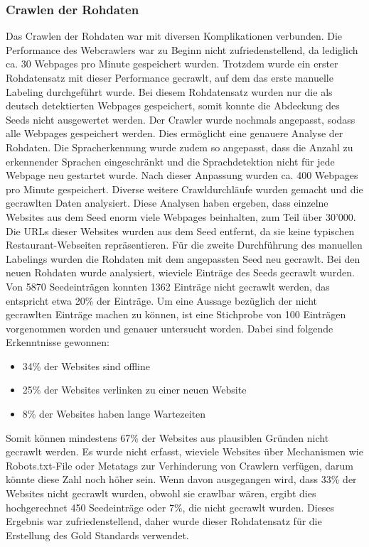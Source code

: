 \subsubsection{Crawlen der Rohdaten}
Das Crawlen der Rohdaten war mit diversen Komplikationen verbunden.
Die Performance des Webcrawlers war zu Beginn nicht zufriedenstellend, da lediglich ca. 30 Webpages pro Minute gespeichert wurden.
Trotzdem wurde ein erster Rohdatensatz mit dieser Performance gecrawlt, auf dem das erste manuelle Labeling durchgeführt wurde.
Bei diesem Rohdatensatz wurden nur die als deutsch detektierten Webpages gespeichert, somit konnte die Abdeckung des Seeds nicht ausgewertet werden.
Der Crawler wurde nochmals angepasst, sodass alle Webpages gespeichert werden.
Dies ermöglicht eine genauere Analyse der Rohdaten.
Die Spracherkennung wurde zudem so angepasst, dass die Anzahl zu erkennender Sprachen eingeschränkt und die Sprachdetektion nicht für jede Webpage neu gestartet wurde.
Nach dieser Anpassung wurden ca. 400 Webpages pro Minute gespeichert.
Diverse weitere Crawldurchläufe wurden gemacht und die gecrawlten Daten analysiert.
Diese Analysen haben ergeben, dass einzelne Websites aus dem Seed enorm viele Webpages beinhalten, zum Teil über 30'000.
Die URLs dieser Websites wurden aus dem Seed entfernt, da sie keine typischen Restaurant-Webseiten repräsentieren.
Für die zweite Durchführung des manuellen Labelings wurden die Rohdaten mit dem angepassten Seed neu gecrawlt.
Bei den neuen Rohdaten wurde analysiert, wieviele Einträge des Seeds gecrawlt wurden.
Von 5870 Seedeinträgen konnten 1362 Einträge nicht gecrawlt werden, das entspricht etwa 20\% der Einträge.
Um eine Aussage bezüglich der nicht gecrawlten Einträge machen zu können, ist eine Stichprobe von 100 Einträgen vorgenommen worden und genauer untersucht worden. Dabei sind folgende Erkenntnisse gewonnen:
\begin{itemize}
	\item 34\% der Websites sind offline
	\item 25\% der Websites verlinken zu einer neuen Website
	\item 8\% der Websites haben lange Wartezeiten
\end{itemize}
Somit können mindestens 67\% der Websites aus plausiblen Gründen nicht gecrawlt werden.
Es wurde nicht erfasst, wieviele Websites über Mechanismen wie Robots.txt-File oder Metatags zur Verhinderung von Crawlern verfügen, darum könnte diese Zahl noch höher sein.
Wenn davon ausgegangen wird, dass 33\% der Websites nicht gecrawlt wurden, obwohl sie crawlbar wären, ergibt dies hochgerechnet 450 Seedeinträge oder 7\%, die nicht gecrawlt wurden.
Dieses Ergebnis war zufriedenstellend, daher wurde dieser Rohdatensatz für die Erstellung des Gold Standards verwendet.
